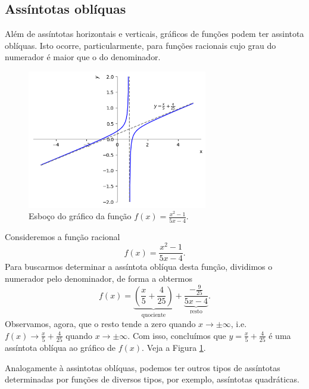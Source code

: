 \subsection{Assíntotas oblíquas}

Além de assíntotas horizontais e verticais, gráficos de funções podem ter assintota oblíquas. Isto ocorre, particularmente, para funções racionais cujo grau do numerador é maior que o do denominador.

\begin{figure}[H]
  \centering
  \includegraphics[width=0.7\textwidth]{./cap_lim/dados/fig_ex_ass_obl/fig_ex_ass_obl}
  \caption{Esboço do gráfico da função $\displaystyle f(x) = \frac{x^2-1}{5x-4}$.}
  \label{fig:ex_ass_obl}
\end{figure}


\begin{ex}
  Consideremos a função racional
  \begin{equation}
    f(x) = \frac{x^2-1}{5x-4}.
  \end{equation}
  Para buscarmos determinar a assíntota oblíqua desta função, dividimos o numerador pelo denominador, de forma a obtermos
  \begin{equation}
    f(x) = \underbrace{\left(\frac{x}{5}+\frac{4}{25}\right)}_{\text{quociente}} + \underbrace{\frac{-\frac{9}{25}}{5x-4}}_{\text{resto}}.
  \end{equation}
  Observamos, agora, que o resto tende a zero quando $x\to\pm\infty$, i.e. $\displaystyle f(x)\to \frac{x}{5}+\frac{4}{25}$ quando $x\to\pm\infty$. Com isso, concluímos que $\displaystyle y = \frac{x}{5}+\frac{4}{25}$ é uma assíntota oblíqua ao gráfico de $f(x)$. Veja a Figura \ref{fig:ex_ass_obl}.
\end{ex}

\begin{obs}
  Analogamente à assintotas oblíquas, podemos ter outros tipos de assíntotas determinadas por funções de diversos tipos, por exemplo, assíntotas quadráticas.
\end{obs}


